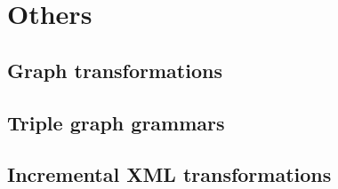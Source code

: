\section{Others}
\label{sec:other-related-work}

\subsection{Graph transformations}
\label{sec:other-related-work:graph}

\subsection{Triple graph grammars}
\label{sec:other-related-work:triple}

\subsection{Incremental XML transformations}
\label{sec:other-related-work:xml}

